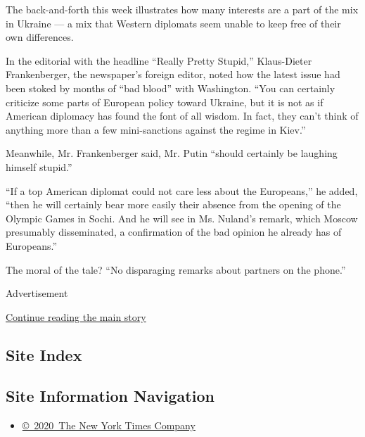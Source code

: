 The back-and-forth this week illustrates how many interests are a part
of the mix in Ukraine --- a mix that Western diplomats seem unable to
keep free of their own differences.

In the editorial with the headline ``Really Pretty Stupid,''
Klaus-Dieter Frankenberger, the newspaper's foreign editor, noted how
the latest issue had been stoked by months of ``bad blood'' with
Washington. ``You can certainly criticize some parts of European policy
toward Ukraine, but it is not as if American diplomacy has found the
font of all wisdom. In fact, they can't think of anything more than a
few mini-sanctions against the regime in Kiev.''

Meanwhile, Mr. Frankenberger said, Mr. Putin ``should certainly be
laughing himself stupid.''

``If a top American diplomat could not care less about the Europeans,''
he added, ``then he will certainly bear more easily their absence from
the opening of the Olympic Games in Sochi. And he will see in Ms.
Nuland's remark, which Moscow presumably disseminated, a confirmation of
the bad opinion he already has of Europeans.''

The moral of the tale? ``No disparaging remarks about partners on the
phone.''

Advertisement

\protect\hyperlink{after-bottom}{Continue reading the main story}

\hypertarget{site-index}{%
\subsection{Site Index}\label{site-index}}

\hypertarget{site-information-navigation}{%
\subsection{Site Information
Navigation}\label{site-information-navigation}}

\begin{itemize}
\tightlist
\item
  \href{https://help.nytimes3xbfgragh.onion/hc/en-us/articles/115014792127-Copyright-notice}{©~2020~The
  New York Times Company}
\end{itemize}

